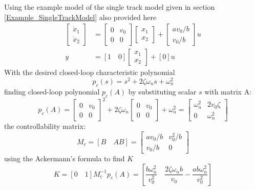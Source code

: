 Using the example model of the single track model given in section \ref{Example_SingleTrackModel} also provided here
\begin{align}
\begin{bmatrix}
\dot{x}_1 \\ \dot{x}_2
\end{bmatrix} &= \begin{bmatrix}
0 & v_0 \\ 0 & 0
\end{bmatrix} \begin{bmatrix}
{x}_1 \\ {x}_2
\end{bmatrix} + \begin{bmatrix}
a v_0/b \\ v_0 / b
\end{bmatrix} u \\
y &= [1 \quad 0] \begin{bmatrix}
{x}_1 \\ {x}_2 \end{bmatrix} + [0] u
\end{align}
With the desired closed-loop characteristic polynomial
\begin{equation}
	p_{c}(s) = s^{2} + 2 \zeta \omega_{n} s + \omega_{n}^{2}
\end{equation}
finding closed-loop polynomial $p_{c}(A)$ by substituting scalar $s$ with matrix A:
\begin{equation}
	p_{c}(A) = \begin{bmatrix}
	0 & v_0 \\ 0 & 0
	\end{bmatrix}^{2} + 2 \zeta \omega_{n} \begin{bmatrix}
	0 & v_0 \\ 0 & 0
	\end{bmatrix} + \omega_{n}^{2} = \begin{bmatrix}
	\omega_{n}^2 & 2 v_0 \zeta \\ 0 & \omega_{n}^{2}
	\end{bmatrix}
\end{equation}
the controllability matrix:
\begin{equation}
	M_{c} = [B \quad AB] = \begin{bmatrix}
	a v_{0}/b & v_{0}^{2}/b \\ v_{0}/b & 0
	\end{bmatrix}
\end{equation}
using the Ackermann's formula to find $K$
\begin{equation}
	K = [0 \quad 1] M_{c}^{-1} p_{c}(A) = \left[\frac{b \omega_{n}^{2}}{v_{0}^{2}} \quad \frac{2 \zeta \omega_{n} b}{v_0} - \frac{a b \omega_{n}^{2}}{v_{0}^{2}}\right]
\end{equation}

